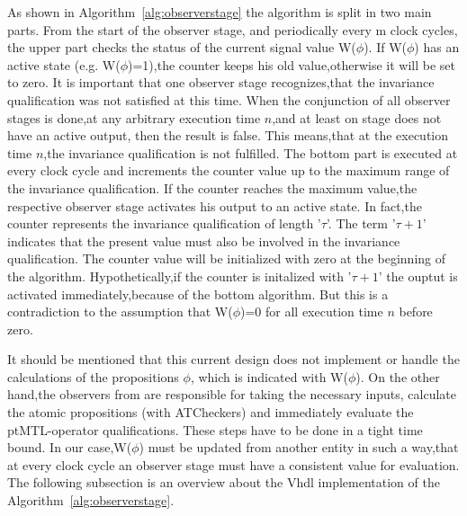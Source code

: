 As shown in Algorithm~\ref{alg:observerstage} the algorithm is split in two main parts. 
From the start of the observer stage, and periodically every m clock cycles,
the upper part checks the status of the current signal value W($\phi$). If W($\phi$) has an active state (e.g. W($\phi$)=1),the counter keeps his old value,otherwise it will be set to zero.
It is important that one observer stage recognizes,that the invariance qualification was not satisfied
at this time. When the conjunction of all observer stages is done,at any arbitrary execution time $n$,and at least on stage does not have an active output,
then the result is false. This means,that at the execution time $n$,the invariance qualification is not fulfilled.
The bottom part is executed at every clock cycle and increments the counter value up to the maximum range of the invariance qualification.
If the counter reaches the maximum value,the respective observer stage activates his output to an active state. In fact,the counter represents the invariance qualification of length
'$\tau$'. The term '$\tau + 1$' indicates that the present value must also be involved in the invariance qualification.
The counter value will be initialized with zero at the beginning of the algorithm. 
Hypothetically,if the counter is initalized with '$\tau + 1$' the ouptut is activated immediately,because
of the bottom algorithm. But this is a contradiction to the assumption that  W($\phi$)=0 for all execution time $n$ before zero.

It should be mentioned that this current design does not implement or handle the calculations of the propositions $\phi$, 
which is indicated with W($\phi$). On the other hand,the observers from \cite{RTFMBJ13} are responsible for taking the necessary inputs,
calculate the atomic propositions (with ATCheckers) and immediately evaluate the ptMTL-operator qualifications.
These steps have to be done in a tight time bound.
In our case,W($\phi$) must be updated from another entity in such a way,that at every clock cycle an observer stage must have a consistent value for evaluation.
The following subsection is an overview about the Vhdl implementation of the Algorithm~\ref{alg:observerstage}.

